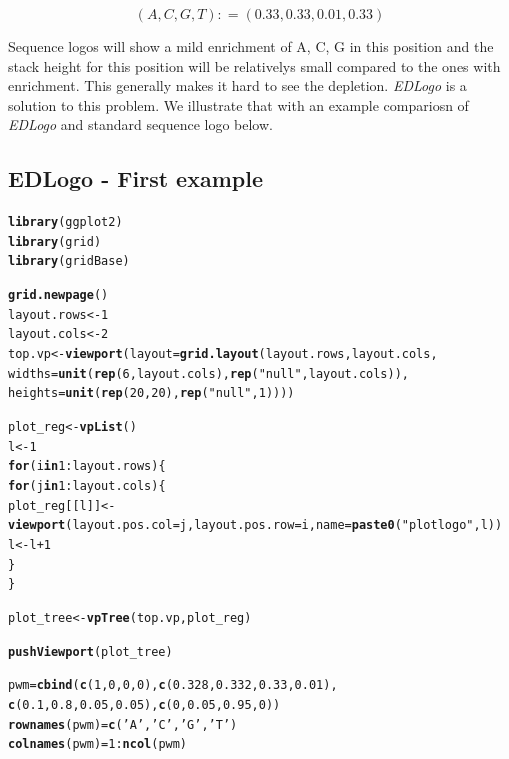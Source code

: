 \documentclass[12pt]{article}\usepackage[]{graphicx}\usepackage[usenames,dvipsnames]{color}
\makeatletter
\newcommand{\hlnum}[1]{\textcolor[rgb]{0.686,0.059,0.569}{#1}}%
\newcommand{\hlstr}[1]{\textcolor[rgb]{0.192,0.494,0.8}{#1}}%
\newcommand{\hlopt}[1]{\textcolor[rgb]{0,0,0}{#1}}%
\newcommand{\hlstd}[1]{\textcolor[rgb]{0.345,0.345,0.345}{#1}}%
\newcommand{\hlkwa}[1]{\textcolor[rgb]{0.161,0.373,0.58}{\textbf{#1}}}%
\newcommand{\hlkwb}[1]{\textcolor[rgb]{0.69,0.353,0.396}{#1}}%
\newcommand{\hlkwc}[1]{\textcolor[rgb]{0.333,0.667,0.333}{#1}}%
\newcommand{\hlkwd}[1]{\textcolor[rgb]{0.737,0.353,0.396}{\textbf{#1}}}%
\newenvironment{kframe}{%
 \def\at@end@of@kframe{}%
 \ifinner\ifhmode%
  \def\at@end@of@kframe{\end{minipage}}%
  \begin{minipage}{\columnwidth}%
 \fi\fi%
 \def\FrameCommand##1{\hskip\@totalleftmargin \hskip-\fboxsep
 \colorbox{shadecolor}{##1}\hskip-\fboxsep
     \hskip-\linewidth \hskip-\@totalleftmargin \hskip\columnwidth}%
 \MakeFramed {\advance\hsize-\width
   \@totalleftmargin\z@ \linewidth\hsize
   \@setminipage}}%
 {\par\unskip\endMakeFramed%
 \at@end@of@kframe}
\newenvironment{knitrout}{}{} %
\makeatother
\begin{document}
$$ \left (A, C, G, T \right ) : = \left ( 0.33, 0.33, 0.01, 0.33 \right )  $$

Sequence logos will show a mild enrichment of A, C, G in this position and the stack height for this position will be relativelys small compared to the ones with enrichment. This generally makes it hard to see the depletion. \textit{EDLogo} is a solution to this problem. We illustrate that with an example compariosn of \textit{EDLogo} and standard sequence logo below.

\subsection{EDLogo - First example}


\begin{knitrout}
\color{fgcolor}\begin{kframe}
\begin{alltt}
\hlkwd{library}\hlstd{(ggplot2)}
\hlkwd{library}\hlstd{(grid)}
\hlkwd{library}\hlstd{(gridBase)}


\hlkwd{grid.newpage}\hlstd{()}
\hlstd{layout.rows} \hlkwb{<-} \hlnum{1}
\hlstd{layout.cols} \hlkwb{<-} \hlnum{2}
\hlstd{top.vp} \hlkwb{<-} \hlkwd{viewport}\hlstd{(}\hlkwc{layout}\hlstd{=}\hlkwd{grid.layout}\hlstd{(layout.rows, layout.cols,}
                                      \hlkwc{widths}\hlstd{=}\hlkwd{unit}\hlstd{(}\hlkwd{rep}\hlstd{(}\hlnum{6}\hlstd{,layout.cols),} \hlkwd{rep}\hlstd{(}\hlstr{"null"}\hlstd{, layout.cols)),}
                                      \hlkwc{heights}\hlstd{=}\hlkwd{unit}\hlstd{(}\hlkwd{rep}\hlstd{(}\hlnum{20}\hlstd{,}\hlnum{20}\hlstd{),} \hlkwd{rep}\hlstd{(}\hlstr{"null"}\hlstd{,}\hlnum{1}\hlstd{))))}

\hlstd{plot_reg} \hlkwb{<-} \hlkwd{vpList}\hlstd{()}
\hlstd{l} \hlkwb{<-} \hlnum{1}
\hlkwa{for}\hlstd{(i} \hlkwa{in} \hlnum{1}\hlopt{:}\hlstd{layout.rows)\{}
  \hlkwa{for}\hlstd{(j} \hlkwa{in} \hlnum{1}\hlopt{:}\hlstd{layout.cols)\{}
    \hlstd{plot_reg[[l]]} \hlkwb{<-} \hlkwd{viewport}\hlstd{(}\hlkwc{layout.pos.col} \hlstd{= j,} \hlkwc{layout.pos.row} \hlstd{= i,} \hlkwc{name} \hlstd{=} \hlkwd{paste0}\hlstd{(}\hlstr{"plotlogo"}\hlstd{, l))}
    \hlstd{l} \hlkwb{<-} \hlstd{l}\hlopt{+}\hlnum{1}
  \hlstd{\}}
\hlstd{\}}

\hlstd{plot_tree} \hlkwb{<-} \hlkwd{vpTree}\hlstd{(top.vp, plot_reg)}

\hlkwd{pushViewport}\hlstd{(plot_tree)}

\hlstd{pwm}\hlkwb{=}\hlkwd{cbind}\hlstd{(}\hlkwd{c}\hlstd{(}\hlnum{1}\hlstd{,}\hlnum{0}\hlstd{,}\hlnum{0}\hlstd{,}\hlnum{0}\hlstd{),}\hlkwd{c}\hlstd{(}\hlnum{0.328}\hlstd{,}\hlnum{0.332}\hlstd{,}\hlnum{0.33}\hlstd{,}\hlnum{0.01}\hlstd{),}
          \hlkwd{c}\hlstd{(}\hlnum{0.1}\hlstd{,}\hlnum{0.8}\hlstd{,}\hlnum{0.05}\hlstd{,}\hlnum{0.05}\hlstd{),}\hlkwd{c}\hlstd{(}\hlnum{0}\hlstd{,}\hlnum{0.05}\hlstd{,}\hlnum{0.95}\hlstd{,}\hlnum{0}\hlstd{))}
\hlkwd{rownames}\hlstd{(pwm)}\hlkwb{=}\hlkwd{c}\hlstd{(}\hlstr{'A'}\hlstd{,}\hlstr{'C'}\hlstd{,}\hlstr{'G'}\hlstd{,}\hlstr{'T'}\hlstd{)}
\hlkwd{colnames}\hlstd{(pwm)}\hlkwb{=}\hlnum{1}\hlopt{:}\hlkwd{ncol}\hlstd{(pwm)}


\end{alltt}
\end{kframe}
\end{knitrout}
\end{document}

